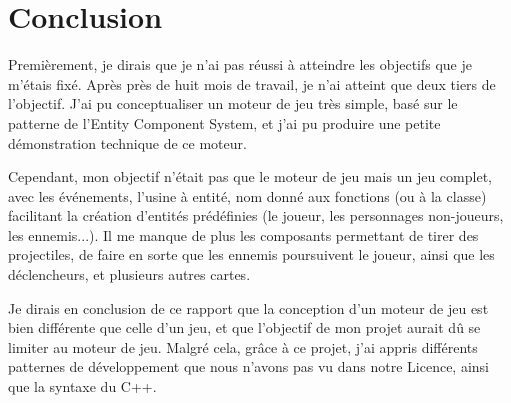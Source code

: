 \documentclass[12pt, openany]{report}
\begin{document}
\chapter{Conclusion}
Premi\`erement, je dirais que je n'ai pas r\'eussi \`a atteindre les objectifs que je m'\'etais fix\'e. Apr\`es pr\`es de huit mois de travail, je n'ai atteint que deux tiers de l'objectif. J'ai pu conceptualiser un moteur de jeu tr\`es simple, bas\'e sur le patterne de l'Entity Component System, et j'ai pu produire une petite d\'emonstration technique de ce moteur.
\\
\par Cependant, mon objectif n'\'etait pas que le moteur de jeu mais un jeu complet, avec les \'ev\'enements, l'usine \`a entit\'e, nom donn\'e aux fonctions (ou \`a la classe) facilitant la cr\'eation d'entit\'es pr\'ed\'efinies (le joueur, les personnages non-joueurs, les ennemis...). Il me manque de plus les composants permettant de tirer des projectiles, de faire en sorte que les ennemis poursuivent le joueur, ainsi que les d\'eclencheurs, et plusieurs autres cartes.
\\
\par
Je dirais en conclusion de ce rapport que la conception d'un moteur de jeu est bien diff\'erente que celle d'un jeu, et que l'objectif de mon projet aurait d\^u se limiter au moteur de jeu. Malgr\'e cela, gr\^ace \`a ce projet, j'ai appris diff\'erents patternes de d\'eveloppement que nous n'avons pas vu dans notre Licence, ainsi que la syntaxe du C++.
\end{document}
